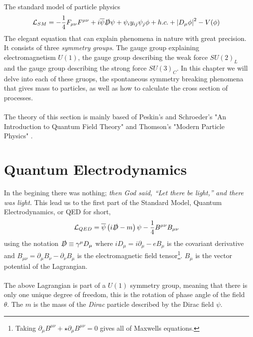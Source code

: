\documentclass[12pt, a4paper]{book}
\begin{document}
The standard model of particle physics
\begin{equation}\label{eq:sm}
    \mathcal{L}_{SM} = -\frac{1}{4}F_{\mu\nu}F^{\mu\nu} + i\overline{\psi}\slashed{D}\psi + \psi_iy_{ij}\psi_j\phi + h.c. + \abs{D_\mu\phi}^2 - V(\phi)
\end{equation}
The elegant equation that can explain phenomena in nature with great precision. It consists of three \textit{symmetry groups}. The gauge group explaining electromagnetism $U(1)$, the gauge group describing the weak force $SU(2)_L$ and the gauge group describing the strong force $SU(3)_C$. 
In this chapter we will delve into each of these gruops, the spontaneous symmetry breaking phenomena that gives mass to particles, as well as how to calculate the cross section of processes.\\
\\The theory of this section is mainly based of Peskin's and Schroeder's "An Introduction to Quantum Field Theory" \cite{Peskin:1995ev} and Thomson's "Modern Particle Physics" \cite{THOMSON}.

\clearpage
\section{Quantum Electrodynamics}
In the begining there was nothing; \textit{then God said, “Let there be light,” and there was light.} This lead us to the first part of the Standard Model, Quantum Electrodynamics, or QED for short,
\begin{equation}\label{eq:QED}
    \mathcal{L}_{QED} = \overline{\psi}\left(i\slashed{D} -m\right)\psi -\frac{1}{4}B^{\mu\nu}B_{\mu\nu}
\end{equation}
using the notation $\slashed{D}\equiv \gamma^\mu D_\mu$ where $iD_\mu = i\partial_\mu -eB_\mu$ is the covariant derivative and $B_{\mu\nu}=\partial_\mu B_\nu - \partial_\nu B_\mu$ is the electromagnetic field tensor\footnote{Taking $\partial_\mu B^{\mu\nu} + \star \partial_\mu B^{\mu\nu} = 0$ gives all of Maxwells equations.}. 
$B_\mu$ is the vector potential of the Lagrangian.\\ 
\\The above Lagrangian is part of a $U(1)$ symmetry group, meaning that there is only one unique degree of freedom, this is the rotation of phase angle of the field $\theta$. The $m$ is the mass of the \textit{Dirac} particle described by the Dirac field $\psi$.
\end{document}
